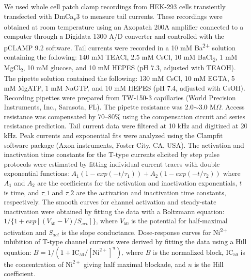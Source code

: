 We used whole cell patch clamp recordings from HEK-293 cells transiently transfected with DmCa\textsubscript{v}3 to measure tail currents. 
These recordings were obtained at room temperature using an Axopatch 200A amplifier connected to a computer through a Digidata 1300 A/D converter and controlled with the pCLAMP 9.2 software.
Tail currents were recorded in a 10 mM Ba\textsuperscript{2+} solution containing the following: 140 mM TEACl, 2.5 mM CsCl, 10 mM BaCl\textsubscript{2}, 1 mM MgCl\textsubscript{2}, 10 mM glucose, and 10 mM HEPES (pH 7.3, adjusted with TEAOH).
The pipette solution contained the following: 130 mM CsCl, 10 mM EGTA, 5 mM MgATP, 1 mM NaGTP, and 10 mM HEPES (pH 7.4, adjusted with CsOH). 
Recording pipettes were prepared from TW-150-3 capillaries (World Precision Instruments, Inc., Sarasota, FL).
The pipette resistance was 2.0$\sim$3.0 M$\Omega$.
Access resistance was compensated by 70--80\% using the compensation circuit and series resistance prediction.
Tail current data were filtered at 10 kHz and digitized at 20 kHz.
Peak currents and exponential fits were analyzed using the Clampfit software package (Axon instruments, Foster City, CA, USA).
The activation and inactivation time constants for the T-type currents elicited by step pulse protocols were estimated by fitting individual current traces with double exponential functions: $A_{1}(1-exp(-t/\tau_{1})) + A_{2}(1-exp(-t/\tau_{2}))$ where $A_{1}$ and $A_{2}$ are the coefficients for the activation and inactivation exponentials, $t$ is time, and $\tau\_{1}$ and $\tau\_{2}$ are the activation and inactivation time constants, respectively.
The smooth curves for channel activation and steady-state inactivation were obtained by fitting the data with a Boltzmann equation: $1/\{1+exp[(V_{50}-V)/S_{act}]\}$, where $V_{50}$ is the potential for half-maximal activation and $S_{act}$ is the slope conductance.
Dose-response curves for Ni\textsuperscript{2+} inhibition of T-type channel currents were derived by fitting the data using a Hill equation: $B = 1/(1 + \textrm{IC}_{50}/[\textrm{Ni}^{2+}]^n)$, where $B$ is the normalized block, $\textrm{IC}_{50}$ is the concentration of $\textrm{Ni}^{2+}$ giving half maximal blockade, and $n$ is the Hill coefficient.
